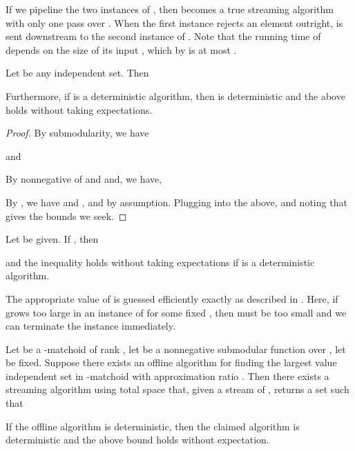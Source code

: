 \documentclass[oneside,letterpaper]{scrartcl} \usepackage{macros}
\begin{document}
If we pipeline the two instances of , then
 becomes a true streaming algorithm
with only one pass over . When the first instance rejects
an element  outright,  is sent downstream to the second instance
of . Note that the running time of
 depends on the size of its input , which by
 is at most .


\begin{lemma}
  Let  be any independent set. Then
  
  Furthermore, if  is a deterministic algorithm, then
   is deterministic and the above
  holds without taking expectations.
\end{lemma}
\begin{proof}
  By submodularity, we have
  
  and
  
  By nonnegative of  and 
  and, we have,
  
  By , we have  and
  , and  by assumption. Plugging into the above, and noting
  that  gives the bounds we
  seek.
\end{proof}
\begin{corollary}
  Let  be given. If ,
  then
  
  and the inequality holds without taking expectations if
   is a deterministic algorithm.
\end{corollary}


The appropriate value of  is guessed efficiently exactly as
described in . Here, if
 grows too large in an instance of
 for some fixed
, then  must be too small and we can terminate the
instance immediately.

\begin{theorem}
  Let  be a -matchoid of rank , let  be a nonnegative submodular
  function over , let  be fixed. Suppose
  there exists an offline algorithm for finding the largest value
  independent set in -matchoid with approximation ratio .
  Then there exists a streaming algorithm using total space
   that, given a stream of , returns a set  such that
  
  If the offline algorithm is deterministic, then the claimed
  algorithm is deterministic and the above bound holds without
  expectation.
\end{theorem}
\end{document}
